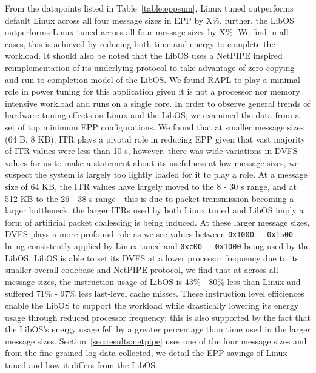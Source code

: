 From the datapoints listed in Table~\ref{table:eppsum}, Linux tuned outperforms default Linux across all four message sizes in EPP by X\%, further, the LibOS outperforms Linux tuned across all four message sizes by X\%. We find in all cases, this is achieved by reducing both time and energy to complete the workload. It should also be noted that the LibOS uses a NetPIPE inspired reimplementation of its underlying protocol to take advantage of zero copying and run-to-completion model of the LibOS. We found RAPL to play a minimal role in power tuning for this application given it is not a processor nor memory intensive workload and runs on a single core. In order to observe general trends of hardware tuning effects on Linux and the LibOS, we examined the data from a set of top minimum EPP configurations. We found that at smaller message sizes (64 B, 8 KB), ITR plays a pivotal role in reducing EPP given that vast majority of ITR values were less than 10 \micro s, however, there was wide variations in DVFS values for us to make a statement about its usefulness at low message sizes, we suspect the system is largely too lightly loaded for it to play a role. At a message size of 64 KB, the ITR values have largely moved to the 8 - 30 \micro s range, and at 512 KB to the 26 - 38 \micro s range - this is due to packet transmission becoming a larger bottleneck, the larger ITRs used by both Linux tuned and LibOS imply a form of artificial packet coalescing is being induced. At these larger message sizes, DVFS plays a more profound role as we see values between \texttt{0x1000 - 0x1500} being consistently applied by Linux tuned and \texttt{0xc00 - 0x1000} being used by the LibOS. LibOS is able to set its DVFS at a lower processor frequency due to its smaller overall codebase and NetPIPE protocol, we find that at across all message sizes, the instruction usage of LibOS is 43\% - 80\% less than Linux and suffered 71\% - 97\% less last-level cache misses. These instruction level efficiences enable the LibOS to support the workload while drastically lowering its energy usage through reduced processor frequency; this is also supported by the fact that the LibOS's energy usage fell by a greater percentage than time used in the larger message sizes. Section~\ref{sec:results:netpipe} uses one of the four message sizes and from the fine-grained log data collected, we detail the EPP savings of Linux tuned and how it differs from the LibOS.

